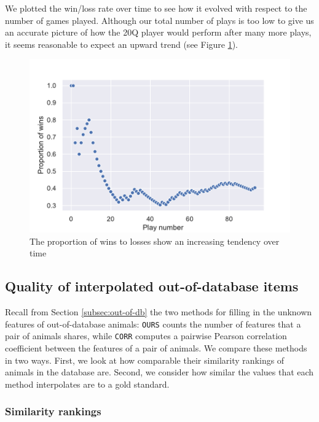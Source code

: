 \documentclass[11pt,a4paper]{article}
\begin{document}
We plotted the win/loss rate over time to see how it evolved with respect to the number of games played. 
Although our total number of plays is too low to give us an accurate picture of how the 20Q player would perform after many more plays, it seems reasonable to expect an upward trend (see Figure \ref{fig:win-over-time}).

\begin{figure}
    \centering
    \includegraphics[scale = .5]{graphics/stats-eval.pdf}
    \caption{The proportion of wins to losses show an increasing tendency over time}
    \label{fig:win-over-time}
\end{figure}

\subsection{Quality of interpolated out-of-database items}
\label{subsec:eval-interpolation}

Recall from Section \ref{subsec:out-of-db} the two methods for filling in the unknown features of out-of-database animals: \texttt{OURS} counts the number of features that a pair of animals shares, while \texttt{CORR} computes a pairwise Pearson correlation coefficient between the features of a pair of animals.
We compare these methods in two ways.
First, we look at how comparable their similarity rankings of animals in the database are. 
Second, we consider how similar the values that each method interpolates are to a gold standard.

\subsubsection{Similarity rankings}
\end{document}

